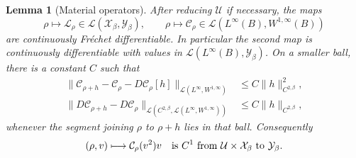 \documentclass[11pt,a4paper]{article}
\newtheorem{lemma}[theorem]{Lemma}
\theoremstyle{definition}
\theoremstyle{remark}
\begin{document}
\begin{lemma}[Material operators]
\label{lem:material}
After reducing $\mathcal U$ if necessary, the maps
\[
 \rho\longmapsto\mathcal L_\rho
       \in\mathcal L(\mathcal X_\beta,\mathcal Y_\beta),
 \qquad
 \rho\longmapsto\mathcal C_\rho
       \in\mathcal L(L^\infty(B),W^{1,\infty}(B))
\]
are continuously Fr\'echet differentiable.  In particular the second map
is continuously differentiable with values in
$\mathcal L(L^\infty(B),\mathcal Y_\beta)$.
On a smaller ball, there is a constant $C$ such that
\begin{align}
 \|\mathcal C_{\rho+h}-\mathcal C_\rho
       -D\mathcal C_\rho[h]\|_{\mathcal L(L^\infty,W^{1,\infty})}
       &\leq C\|h\|_{C^{2,\beta}}^2,
       \label{eq:state-coulomb-remainder}\\
 \|D\mathcal C_{\rho+h}-D\mathcal C_\rho\|
 _{\mathcal L(C^{2,\beta},\mathcal L(L^\infty,W^{1,\infty}))}
       &\leq C\|h\|_{C^{2,\beta}},
       \label{eq:state-coulomb-continuity}
\end{align}
whenever the segment joining $\rho$ to $\rho+h$ lies in that ball.
Consequently
\[
 (\rho,v)\longmapsto\mathcal C_\rho(v^2)v
 \quad\hbox{is }C^1\hbox{ from }\mathcal U\times \mathcal X_\beta
                          \hbox{ to }\mathcal Y_\beta.
\]
\end{lemma}
\end{document}
